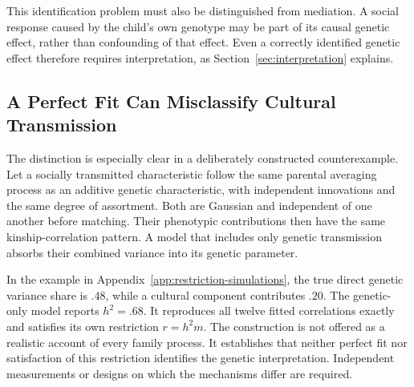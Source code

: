 This identification problem must also be distinguished from mediation.
A social response caused by the child's own genotype may be part of its
causal genetic effect, rather than confounding of that effect. Even a
correctly identified genetic effect therefore requires interpretation,
as Section~\ref{sec:interpretation} explains.


\subsection{A Perfect Fit Can Misclassify Cultural Transmission}
The distinction is especially clear in a deliberately constructed
counterexample. Let a socially transmitted characteristic follow the same
parental averaging process as an additive genetic characteristic, with
independent innovations and the same degree of assortment. Both are
Gaussian and independent of one another before matching. Their phenotypic
contributions then have the same kinship-correlation pattern. A model
that includes only genetic transmission absorbs their combined variance
into its genetic parameter.

In the example in Appendix~\ref{app:restriction-simulations}, the true
direct genetic variance share is $.48$, while a cultural component
contributes $.20$. The genetic-only model reports $h^2=.68$. It reproduces
all twelve fitted correlations exactly and satisfies its own restriction
$r=h^2m$. The construction is not offered as a realistic account of every
family process. It establishes that neither perfect fit nor satisfaction
of this restriction identifies the genetic interpretation. Independent
measurements or designs on which the mechanisms differ are required.
